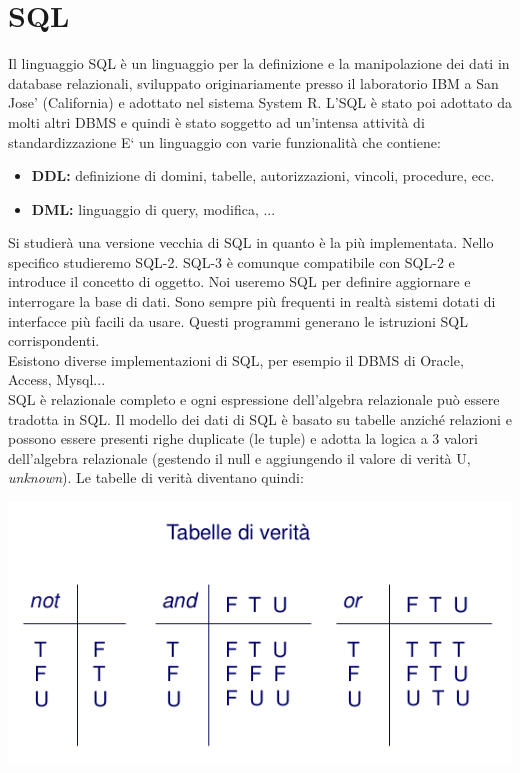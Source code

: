\documentclass[a4paper,12pt, oneside]{book}
\begin{document}
\chapter{SQL}
Il linguaggio SQL è un linguaggio per la definizione e la manipolazione dei dati in database relazionali, sviluppato originariamente presso il laboratorio IBM a San Jose’ (California) e adottato nel sistema System R.
L’SQL è stato poi adottato da molti altri DBMS e quindi è stato soggetto ad un’intensa attività di standardizzazione
E‘ un linguaggio con varie funzionalità che contiene:
\begin{itemize}
\item \textbf{DDL:} definizione di domini, tabelle, autorizzazioni, vincoli,
procedure, ecc.
\item \textbf{DML:} linguaggio di query, modifica, ...
\end{itemize}
Si studierà una versione vecchia di SQL in quanto è la più implementata. Nello specifico studieremo SQL-2. SQL-3 è comunque compatibile con SQL-2 e introduce il concetto di oggetto. Noi useremo SQL per definire aggiornare e interrogare la base di dati. Sono sempre più frequenti in realtà sistemi dotati di interfacce più facili da usare. Questi programmi generano le istruzioni SQL corrispondenti.\\
Esistono diverse implementazioni di SQL, per esempio il DBMS di Oracle, Access, Mysql...\\
SQL è relazionale completo e ogni espressione dell'algebra relazionale può essere tradotta in SQL. Il modello dei dati di SQL è basato su tabelle anziché relazioni e possono essere presenti righe duplicate (le tuple) e adotta la logica a 3 valori dell'algebra relazionale (gestendo il null e aggiungendo il valore di verità U, \textit{unknown}). 
\newpage 
Le tabelle di verità diventano quindi:
\begin{center}
	\includegraphics[scale=0.7]{img/unk.png}
\end{center}
\end{document}
